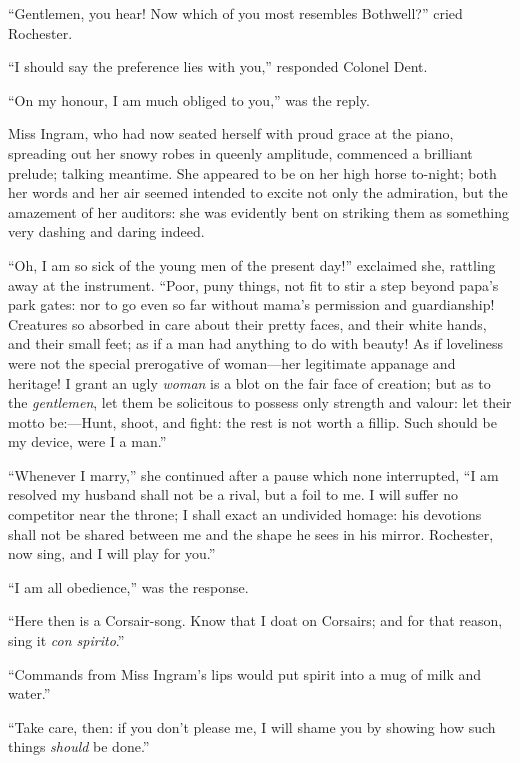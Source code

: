 \enquote{Gentlemen, you hear! Now which of you most resembles
	Bothwell?} cried \Mr{} Rochester.

\enquote{I should say the preference lies with you,} responded Colonel
Dent.

\enquote{On my honour, I am much obliged to you,} was the reply.

Miss Ingram, who had now seated herself with proud grace at the piano,
spreading out her snowy robes in queenly amplitude, commenced a
brilliant prelude; talking meantime. She appeared to be on her high
horse to-night; both her words and her air seemed intended to excite not
only the admiration, but the amazement of her auditors: she was
evidently bent on striking them as something very dashing and daring
indeed.

\enquote{Oh, I am so sick of the young men of the present day!}
exclaimed she, rattling away at the instrument. \enquote{Poor, puny things,
	not fit to stir a step beyond papa's park gates: nor to go even so far
	without mama's permission and guardianship! Creatures so absorbed in
	care about their pretty faces, and their white hands, and their small
	feet; as if a man had anything to do with beauty! As if loveliness were
	not the special prerogative of woman---her legitimate appanage and
	heritage! I grant an ugly \emph{woman} is a blot on the fair face of
	creation; but as to the \emph{gentlemen}, let them be solicitous to
	possess only strength and valour: let their motto be:---Hunt, shoot, and
	fight: the rest is not worth a fillip. Such should be my device, were I
	a man.}

\enquote{Whenever I marry,} she continued after a pause which none
interrupted, \enquote{I am resolved my husband shall not be a rival, but
	a foil to me. I will suffer no competitor near the throne; I shall
	exact an undivided homage: his devotions shall not be shared between me
	and the shape he sees in his mirror. \Mr{} Rochester, now sing, and I
	will play for you.}

\enquote{I am all obedience,} was the response.

\enquote{Here then is a Corsair-song. Know that I doat on Corsairs; and for
	that reason, sing it \emph{con spirito}.}

\enquote{Commands from Miss Ingram's lips would put spirit into a mug of
	milk and water.}

\enquote{Take care, then: if you don't please me, I will shame you by showing
	how such things \emph{should} be done.}

